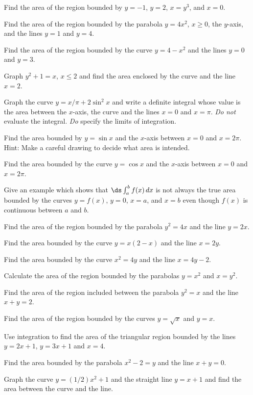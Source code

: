 \begin{multicols}{2}
  \problem Find the area of the region bounded by $y=-1$, $y=2$, $x=y^3$, and
  $x=0$.


  \problem Find the area of the region bounded by the parabola $y=4x^2$,
  $x\ge 0$, the $y$-axis, and the lines $y=1$ and $y=4$.


  \problem Find the area of the region bounded by the curve $y=4-x^2$ and the
  lines $y=0$ and $y=3$.


  \problem Graph $y^2+1=x$, $x\le 2$ and find the area enclosed by the curve
  and the line $x=2$.


  \problem Graph the curve $y=x/\pi+2\sin^2 x$ and write a definite integral
  whose value is the area between the $x$-axis, the curve and the lines $x=0$
  and $x=\pi$.  {\em Do not} evaluate the integral.  {\em Do} specify the
  limits of integration.




  \problem Find the area bounded by $y=\sin x$ and the $x$-axis between $x=0$
  and $x=2\pi$.  Hint: Make a careful drawing to decide what area is
  intended.


  \problem Find the area bounded by the curve $y=\cos x$ and the $x$-axis
  between $x=0$ and $x=2\pi$.


  \problem Give an example which shows that $\ds\int_a^b f(x)\, dx$ is not
  always the true area bounded by the curves $y=f(x)$, $y=0$, $x=a$, and
  $x=b$ even though $f(x)$ is continuous between $a$ and $b$.


  \problem Find the area of the region bounded by the parabola $y^2=4x$ and
  the line $y=2x$.


  \problem Find the area bounded by the curve $y=x(2-x)$ and the line $x=2y$.


  \problem Find the area bounded by the curve $x^2=4y$ and the line $x=4y-2$.


  \problem Calculate the area of the region bounded by the parabolas $y=x^2$
  and $x=y^2$.


  \problem Find the area of the region included between the parabola $y^2=x$
  and the line $x+y=2$.


  \problem Find the area of the region bounded by the curves $y=\sqrt{x}$ and
  $y=x$.


  \problem Use integration to find the area of the triangular region bounded
  by the lines $y=2x+1$, $y=3x+1$ and $x=4$.


  \problem Find the area bounded by the parabola $x^2-2=y$ and the line
  $x+y=0$.


  \problem Graph the curve $y=(1/2)x^2+1$ and the straight line $y=x+1$ and
  find the area between the curve and the line.



\end{multicols}

